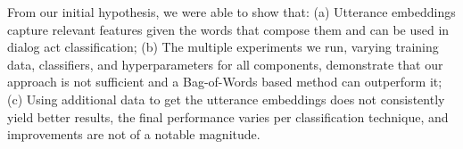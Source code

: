 From our initial hypothesis, we were able to show that: (a) Utterance embeddings capture relevant features given the words that compose them and can be used in dialog act classification; (b) The multiple experiments we run, varying training data, classifiers, and hyperparameters for all components, demonstrate that our approach is not sufficient and a Bag-of-Words based method can outperform it; (c) Using additional data to get the utterance embeddings does not consistently yield better results, the final performance varies per classification technique, and improvements are not of a notable magnitude.